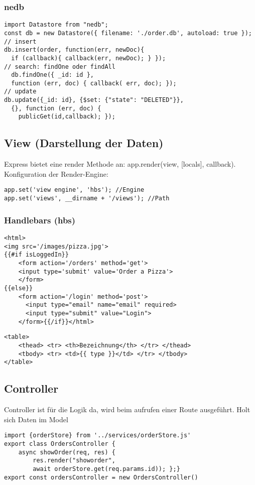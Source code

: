 \subsubsection{nedb}
\begin{lstlisting}
import Datastore from "nedb";
const db = new Datastore({ filename: './order.db', autoload: true });
// insert
db.insert(order, function(err, newDoc){
  if (callback){ callback(err, newDoc); } });
// search: findOne oder findAll
  db.findOne({ _id: id }, 
  function (err, doc) { callback( err, doc); });
// update
db.update({_id: id}, {$set: {"state": "DELETED"}}, 
  {}, function (err, doc) {
    publicGet(id,callback); });
\end{lstlisting}


\subsection{View (Darstellung der Daten)}
Express bietet eine render Methode an: app.render(view, [locals], callback). Konfiguration der Render-Engine:
\begin{lstlisting}
app.set('view engine', 'hbs'); //Engine
app.set('views', __dirname + '/views'); //Path
\end{lstlisting}
\subsubsection{Handlebars (hbs)}
\begin{lstlisting}
<html>
<img src='/images/pizza.jpg'>
{{#if isLoggedIn}}
    <form action='/orders' method='get'>
    <input type='submit' value='Order a Pizza'>
    </form>
{{else}}
    <form action='/login' method='post'>
      <input type="email" name="email" required>
      <input type="submit" value="Login">
    </form>{{/if}}</html>
\end{lstlisting}
\begin{lstlisting}
<table>
    <thead> <tr> <th>Bezeichnung</th> </tr> </thead>
    <tbody> <tr> <td>{{ type }}</td> </tr> </tbody>
</table>
\end{lstlisting}


\subsection{Controller}
Controller ist für die Logik da, wird beim aufrufen einer Route ausgeführt. Holt sich Daten im Model
\begin{lstlisting}
import {orderStore} from '../services/orderStore.js'
export class OrdersController {
    async showOrder(req, res) {
        res.render("showorder", 
        await orderStore.get(req.params.id)); };}
export const ordersController = new OrdersController()
\end{lstlisting}

